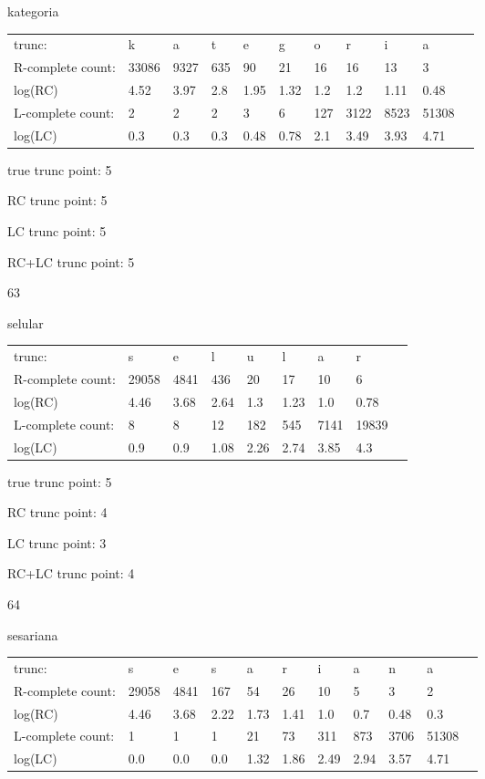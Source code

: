 \documentclass{article}
\begin{document}
kategoria

\begin{tabular}{l|llllllllll}
trunc: & k & a & t & e & g & o & r & i & a & \\ 
R-complete count: & 33086 & 9327 & 635 & 90 & 21 & 16 & 16 & 13 & 3 & \\ 
log(RC) & 4.52 & 3.97 & 2.8 & 1.95 & 1.32 & 1.2 & 1.2 & 1.11 & 0.48 & \\ 
L-complete count: & 2 & 2 & 2 & 3 & 6 & 127 & 3122 & 8523 & 51308 & \\ 
log(LC) & 0.3 & 0.3 & 0.3 & 0.48 & 0.78 & 2.1 & 3.49 & 3.93 & 4.71 & \\ 
\end{tabular}

true trunc point: 5

RC trunc point: 5

LC trunc point: 5

RC+LC trunc point: 5

\vspace{1em}

63

selular

\begin{tabular}{l|llllllll}
trunc: & s & e & l & u & l & a & r & \\ 
R-complete count: & 29058 & 4841 & 436 & 20 & 17 & 10 & 6 & \\ 
log(RC) & 4.46 & 3.68 & 2.64 & 1.3 & 1.23 & 1.0 & 0.78 & \\ 
L-complete count: & 8 & 8 & 12 & 182 & 545 & 7141 & 19839 & \\ 
log(LC) & 0.9 & 0.9 & 1.08 & 2.26 & 2.74 & 3.85 & 4.3 & \\ 
\end{tabular}

true trunc point: 5

RC trunc point: 4

LC trunc point: 3

RC+LC trunc point: 4

\vspace{1em}

64

sesariana

\begin{tabular}{l|llllllllll}
trunc: & s & e & s & a & r & i & a & n & a & \\ 
R-complete count: & 29058 & 4841 & 167 & 54 & 26 & 10 & 5 & 3 & 2 & \\ 
log(RC) & 4.46 & 3.68 & 2.22 & 1.73 & 1.41 & 1.0 & 0.7 & 0.48 & 0.3 & \\ 
L-complete count: & 1 & 1 & 1 & 21 & 73 & 311 & 873 & 3706 & 51308 & \\ 
log(LC) & 0.0 & 0.0 & 0.0 & 1.32 & 1.86 & 2.49 & 2.94 & 3.57 & 4.71 & \\ 
\end{tabular}
\end{document}
